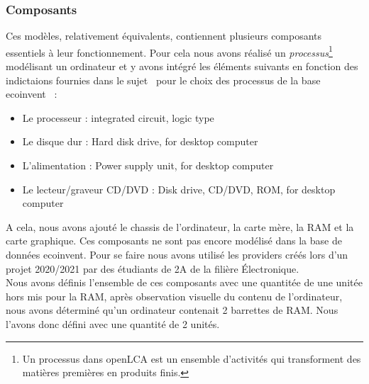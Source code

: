 \documentclass[12pt,a4paper]{paper}
\begin{document}
\subsubsection{Composants}
Ces modèles, relativement équivalents, contiennent plusieurs composants essentiels à leur fonctionnement. Pour cela nous avons réalisé un \textit{processus}\footnote{Un processus dans openLCA est un ensemble d'activités qui transforment des matières premières en produits finis.} modélisant un ordinateur et y avons intégré les éléments suivants en fonction des indictaions fournies dans le sujet~\cite{TP2_ACV_ENSEIRB-MATMECA} pour le choix des processus de la base ecoinvent~\cite{ecoinvent2024} :
\begin{itemize}
    \item Le processeur : integrated circuit, logic type
    \item Le disque dur : Hard disk drive, for desktop computer
    \item L'alimentation : Power supply unit, for desktop computer
    \item Le lecteur/graveur CD/DVD : Disk drive, CD/DVD, ROM, for desktop computer
\end{itemize}
A cela, nous avons ajouté le chassis de l'ordinateur, la carte mère, la RAM et la carte graphique. Ces composants ne sont pas encore modélisé dans la base de données ecoinvent. Pour se faire nous avons utilisé les providers créés lors d’un projet 2020/2021 par des étudiants de 2A de la filière Électronique.\\
Nous avons définis l'ensemble de ces composants avec une quantitée de une unitée hors mis pour la RAM, après observation visuelle du contenu de l'ordinateur, nous avons déterminé qu'un ordinateur contenait 2 barrettes de RAM. Nous l'avons donc défini avec une quantité de 2 unités.

\end{document}
